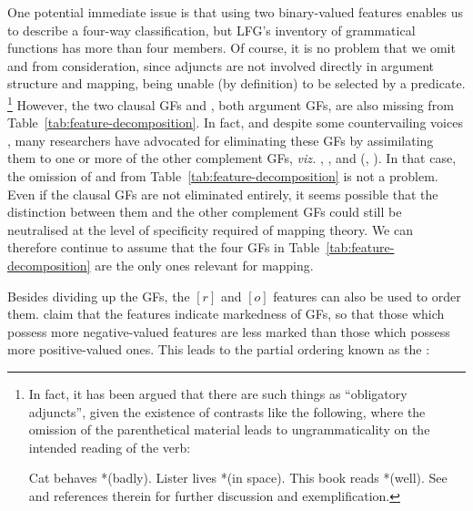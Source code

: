 \documentclass[output=paper]{langscibook}
\begin{document}
One potential immediate issue is that using two binary-valued features enables us
to describe a four-way classification, but LFG's inventory of grammatical
functions has more than four members. Of course, it is no problem that we omit
\ADJ and \XADJ from consideration, since adjuncts are not involved directly in
argument structure and mapping, being unable (by definition) to be selected by a
predicate.%
%
\footnote{In fact, it has been argued that there are such things as ``obligatory
  adjuncts'', given the existence of contrasts like the following, where the
  omission of the parenthetical material leads to ungrammaticality on the
  intended reading of the verb:

  \ea
  \ea
  Cat behaves *(badly).
  \ex
  Lister lives *(in space).
  \ex
  This book reads *(well).
  \z
  \z
  See \citet[262--263]{Przep16} and references therein for further discussion
  and exemplification.}
%
However, the two clausal GFs \COMP and \XCOMP, both argument GFs, are also
missing from Table~\ref{tab:feature-decomposition}. In fact, and despite some
countervailing voices \citep{DL00,Lodrup2012}, many researchers have advocated
for eliminating these GFs by assimilating them to one or more of the other
complement GFs, \textit{viz.} \OBJ, \OBJTHETA, and \OBLTHETA
(\citealp[197--198]{zaeneng94},
\citealp{alsina1996the-role,AMM05,forst06,berman2007,patejuk2016reducing,Szucs2018}).
In that case, the omission of \COMP and \XCOMP from
Table~\ref{tab:feature-decomposition} is not a problem. Even if the clausal GFs
are not eliminated entirely, it seems possible that the distinction between them
and the other complement GFs could still be neutralised at the level of
specificity required of mapping theory. We can therefore continue to assume that
the four GFs in Table~\ref{tab:feature-decomposition} are the only ones relevant
for mapping.

Besides dividing up the GFs, the $[r]$ and $[o]$ features can also be used to
order them. \citet[49]{bresnanzaenen90} claim that the features indicate
markedness of GFs, so that those which possess more negative-valued features are
less marked than those which possess more positive-valued ones. This leads to
the partial ordering known as the :
\end{document}
